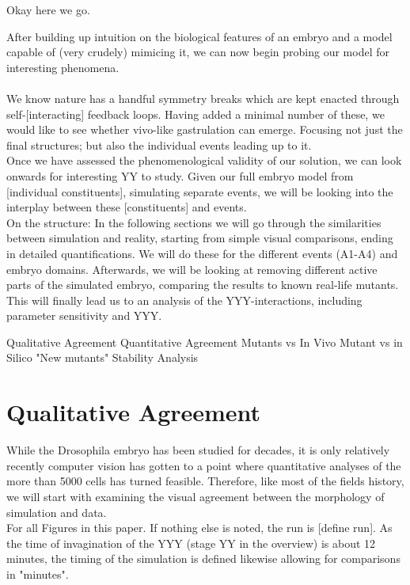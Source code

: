 Okay here we go.

After building up intuition on the biological features of an embryo and a model capable of (very crudely) mimicing it, we can now begin probing our model for interesting phenomena.\\
\\
We know nature has a handful symmetry breaks which are kept enacted through self-[interacting] feedback loops. Having added a minimal number of these, we would like to see whether vivo-like gastrulation can emerge. Focusing not just the final structures; but also the individual events leading up to it.\\
 
Once we have assessed the phenomenological validity of our solution, we can look onwards for interesting YY to study. Given our full embryo model from [individual constituents], simulating separate events, we will be looking into the interplay between these [constituents] and events. \reph\\


On the structure: In the following sections we will go through the similarities between simulation and reality, starting from simple visual comparisons, ending in detailed quantifications. We will do these for the different events (A1-A4) and embryo domains. Afterwards, we will be looking at removing different active parts of the simulated embryo, comparing the results to known real-life mutants. This will finally lead us to an analysis of the YYY-interactions, including parameter sensitivity and YYY. 

Qualitative Agreement
Quantitative Agreement
Mutants vs In Vivo
Mutant vs in Silico
"New mutants"
Stability Analysis



\newpage

\section{Qualitative Agreement}
While the Drosophila embryo has been studied for decades, it is only relatively recently computer vision has gotten to a point where quantitative analyses of the more than 5000 cells has turned feasible. Therefore, like most of the fields history, we will start with examining the visual agreement between the morphology of simulation and data.\\

For all Figures in this paper. If nothing else is noted, the run is [define run]. As the time of invagination of the YYY (stage YY in the overview) is about 12 minutes, the timing of the simulation is defined likewise allowing for comparisons in "minutes".

